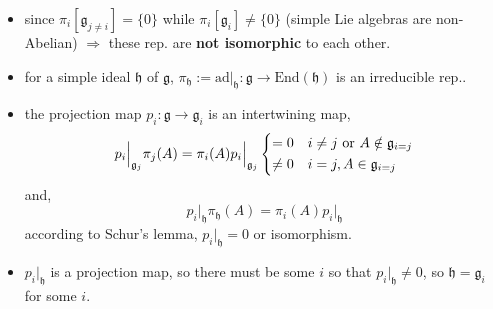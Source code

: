 \begin{itemize}
\begin{tcolorbox}[title=proof:]
\begin{itemize}
			\item since $\pi_i[\mathfrak{g}_{j \neq i}] = \{0\}$ while $\pi_i[\mathfrak{g}_i] \neq \{0\}$ (simple Lie algebras are non-Abelian) $\Longrightarrow$ these rep. are \textbf{not isomorphic} to each other.
			
			\item for a simple ideal $\mathfrak{h}$ of $\mathfrak{g}$, $\pi_\mathfrak{h} := \mathrm{ad} \big|_\mathfrak{h} : \mathfrak{g} \rightarrow \mathrm{End}(\mathfrak{h})$ is an irreducible rep..
			
			\item the projection map $p_i : \mathfrak{g} \rightarrow \mathfrak{g}_i$ is an intertwining map,
			\begin{equation}
				p_i \Big|_{\mathfrak{g}_j} \pi_j(A) = \pi_i(A) p_i \Big|_{\mathfrak{g}_j} \begin{dcases}
					= 0 & i \neq j \ \text{or} \ A \notin \mathfrak{g}_{i = j} \\
					\neq 0 & i = j, A \in \mathfrak{g}_{i = j}
				\end{dcases}
			\end{equation}
			and,
			\begin{equation}
				p_i \Big|_\mathfrak{h} \pi_\mathfrak{h}(A) = \pi_i(A) p_i \Big|_\mathfrak{h}
			\end{equation}
			according to Schur's lemma, $p_i \big|_\mathfrak{h} = 0$ or isomorphism.
			
			\item $p_i \big|_\mathfrak{h}$ is a projection map, so there must be some $i$ so that $p_i \big|_\mathfrak{h} \neq 0$, so $\mathfrak{h} = \mathfrak{g}_i$ for some $i$.
		\end{itemize}
	\end{tcolorbox}
\end{itemize}

